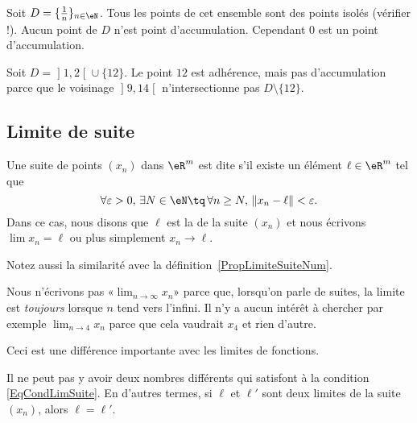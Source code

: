 \begin{example}
	Soit $D=\{ \frac{1}{ n }\}_{n\in\eN}$. Tous les points de cet ensemble sont des points isolés (vérifier !).  Aucun point de $D$ n'est point d'accumulation. Cependant $0$ est un point d'accumulation.
\end{example}

\begin{example}     \label{EXooWOYQooJolaTV}
    Soit \( D=\mathopen] 1 , 2 \mathclose[\cup\{ 12 \}\). Le point \( 12\) est adhérence, mais pas d'accumulation parce que le voisinage \( \mathopen] 9 , 14 \mathclose[\) n'intersectionne pas \( D\setminus \{ 12 \}\).
\end{example}

\subsection{Limite de suite}

\begin{definition}
	Une suite de points $(x_n)$ dans $\eR^m$ est dite  s'il existe un élément $\ell\in\eR^m$ tel que
	\begin{equation}	\label{EqCondLimSuite}
		\forall\varepsilon>0,\,\exists N\in \eN\tq\,\forall n\geq N,\,\| x_n-\ell \|<\varepsilon.
	\end{equation}
	Dans ce cas, nous disons que $\ell$ est la  de la suite $(x_n)$ et nous écrivons $\lim x_n=\ell$ ou plus simplement $x_n\to \ell$.
\end{definition}
Notez aussi la similarité avec la définition~\ref{PropLimiteSuiteNum}.

\begin{remark}
	Nous n'écrivons pas «$\lim_{n\to\infty}x_n$» parce que, lorsqu'on parle de suites, la limite est \emph{toujours} lorsque $n$ tend vers l'infini. Il n'y a aucun intérêt à chercher par exemple $\lim_{n\to 4}x_n$ parce que cela vaudrait $x_4$ et rien d'autre.

	Ceci est une différence importante avec les limites de fonctions.
\end{remark}

\begin{lemma}
	Il ne peut pas y avoir deux nombres différents qui satisfont à la condition \eqref{EqCondLimSuite}. En d'autres termes, si $\ell$ et $\ell'$ sont deux limites de la suite $(x_n)$, alors $\ell=\ell'$.
\end{lemma}

